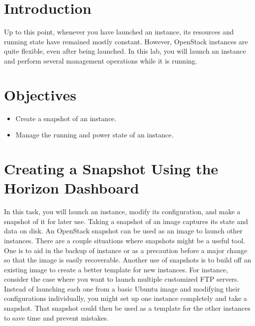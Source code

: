 \documentclass[letterpaper, 12pt]{article}
\begin{document}

\section*{Introduction}
\label{sec:introduction}
Up to this point, whenever you have launched an instance, its resources and running state have remained mostly constant.
However, OpenStack instances are quite flexible, even after being launched.
In this lab, you will launch an instance and perform several management operations while it is running.

\section*{Objectives}
\label{sec:objectives}
\begin{itemize}[itemsep=0pt]
    \item Create a snapshot of an instance.
    \item Manage the running and power state of an instance.
\end{itemize}
\clearpage

\labsettings

\section{Creating a Snapshot Using the Horizon Dashboard}
\label{sec:creating_a_snapshot_web}
In this task, you will launch an instance, modify its configuration, and make a snapshot of it for later use.
Taking a snapshot of an image captures its state and data on disk.
An OpenStack snapshot can be used as an image to launch other instances.
There are a couple situations where snapshots might be a useful tool.
One is to aid in the backup of instance or as a precaution before a major change so that the image is easily recoverable.
Another use of snapshots is to build off an existing image to create a better template for new instances.
For instance, consider the case where you want to launch multiple customized FTP servers.
Instead of launching each one from a basic Ubuntu image and modifying their configurations individually, you might set up one instance completely and take a snapshot.
That snapshot could then be used as a template for the other instances to save time and prevent mistakes.
\end{document}
